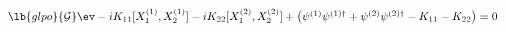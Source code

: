 \begin{equation}
\begin{array}{l}
\lb{glpo}
{\cal G}\ev -iK_{11}[X_{1}^{(1)}, X_{2}^{(1)}] -
iK_{22} [X_{1}^{(2)}, X_{2}^{(2)}]
+ \left( \psi^{(1)} \psi^{(1)\dag} + 
\psi^{(2)} \psi^{(2)\dag} - K_{11} - K_{22}\right)=0
\end{array}
\end{equation}

